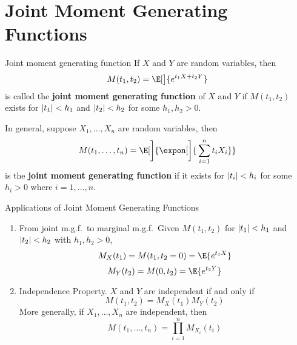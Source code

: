 \section{Joint Moment Generating Functions}
\begin{Definition}{Joint moment generating function}{}
    If $ X $ and $ Y $ are random variables, then
    \[ M(t_1,t_2)=\E[\big]{e^{t_1X+t_2Y}} \]
    is called the \textbf{joint moment generating function}
    of $ X $ and $ Y $ if $ M(t_1,t_2) $ exists for
    $ \lvert t_1\rvert<h_1 $ and $ \lvert t_2\rvert<h_2 $
    for some $ h_1,h_2>0 $.
\end{Definition}
\begin{Remark}{}{}
    In general, suppose $ X_1,\ldots,X_n $ are random variables,
    then
    \[ M(t_1,\ldots,t_n)=\E[\bigg]{\expon[\bigg]{\,\sum_{i=1}^{n} t_i X_i}} \]
    is the \textbf{joint moment generating function}
    if it exists for $ \lvert t_i\rvert<h_i $
    for some $ h_i>0 $ where $ i=1,\ldots,n $.
\end{Remark}
\begin{Remark}{Applications of Joint Moment Generating Functions}{}
    \begin{enumerate}[label=(\arabic*)]
        \item From joint m.g.f.\ to marginal m.g.f.\
              Given $ M(t_1,t_2) $ for $ \lvert t_1\rvert<h_1 $
              and $ \lvert t_2\rvert<h_2 $
              with $ h_1,h_2>0 $,
              \[ M_X(t_1)=M(t_1,t_2=0)=\E{e^{t_1X}} \]
              \[ M_Y(t_2)=M(0,t_2)=\E{e^{t_2Y}} \]
        \item Independence Property. $ X $ and
              $ Y $ are independent if and only if
              \[ M(t_1,t_2)=M_X(t_1)M_Y(t_2) \]
              More generally, if $ X_1,\ldots,X_n $ are
              independent, then
              \[ M(t_1,\ldots,t_n)=\prod_{i=1}^n M_{X_i}(t_i) \]
    \end{enumerate}
\end{Remark}
